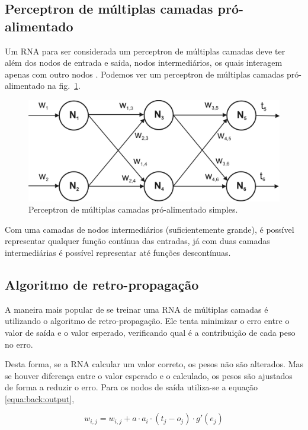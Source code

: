 \subsection{Perceptron de múltiplas camadas pró-alimentado}

Um RNA para ser considerada um perceptron de múltiplas camadas deve ter além dos nodos de entrada e saída, nodos intermediários, os quais interagem apenas com outro nodos \cite{sandhya}. Podemos ver um perceptron de múltiplas camadas pró-alimentado na fig.~\ref{fig:rna}.

\begin{figure}[ht]
 \begin{center}
  \includegraphics[width=5.8in]{imagens/rna.png}
 \end{center}
 \caption{Perceptron de múltiplas camadas pró-alimentado simples.}
 \label{fig:rna}
\end{figure}

Com uma camadas de nodos intermediários (suficientemente grande), é possível representar qualquer função contínua das entradas, já com duas camadas intermediárias é possível representar até funções descontínuas.

\subsection{Algoritmo de retro-propagação}

A maneira mais popular de se treinar uma RNA de múltiplas camadas é utilizando o algoritmo de retro-propagação. Ele tenta minimizar o erro entre o valor de saída e o valor esperado, verificando qual é a contribuição de cada peso no erro.

Desta forma, se a RNA calcular um valor correto, os pesos não são alterados. Mas se houver diferença entre o valor esperado e o calculado, os pesos são ajustados de forma a reduzir o erro. Para os nodos de saída utiliza-se a equação \ref{equa:back:output},

\begin{equation}
	w_{i,j} = w_{i,j} + a \cdot a_i \cdot (t_j - o_j) \cdot g'(e_j)
	\label{equa:back:output}
\end{equation}

